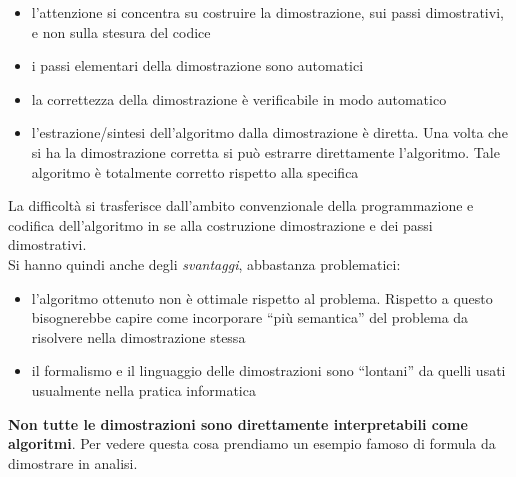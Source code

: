 \documentclass[a4paper,12pt, oneside]{book}
\begin{document}
\begin{itemize}
  \item l'attenzione si concentra su costruire la dimostrazione, sui passi
  dimostrativi, e non sulla stesura del codice
  \item i passi elementari della dimostrazione sono automatici
  \item la correttezza della dimostrazione è verificabile in modo automatico
  \item l'estrazione/sintesi dell'algoritmo dalla dimostrazione è diretta. Una
  volta che si ha la dimostrazione corretta si può estrarre direttamente
  l'algoritmo. Tale algoritmo è totalmente corretto rispetto alla specifica
\end{itemize}
La difficoltà si trasferisce dall'ambito convenzionale della programmazione e
codifica dell'algoritmo in se alla costruzione dimostrazione e dei passi
dimostrativi.\\
Si hanno quindi anche degli \textit{svantaggi}, abbastanza problematici:
\begin{itemize}
  \item l'algoritmo ottenuto non è ottimale rispetto al problema. Rispetto a
  questo bisognerebbe capire come incorporare ``più semantica'' del problema da
  risolvere nella dimostrazione stessa
  \item il formalismo e il linguaggio delle dimostrazioni sono ``lontani'' da
  quelli usati usualmente nella pratica informatica
\end{itemize}
\textbf{Non tutte le dimostrazioni sono direttamente interpretabili come
  algoritmi}. Per vedere questa cosa prendiamo un esempio famoso di formula da
dimostrare in analisi.
\end{document}
